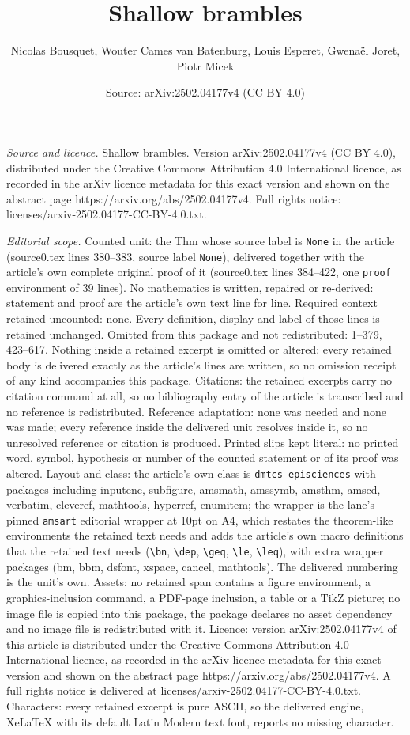 \documentclass[10pt,a4paper]{amsart}
\title[Shallow brambles]{Shallow brambles}
\author{Nicolas Bousquet, Wouter Cames van Batenburg, Louis Esperet, Gwena\"el Joret, Piotr Micek}
\date{Source: arXiv:2502.04177v4 (CC BY 4.0)}
\begin{document}
\maketitle

\noindent\emph{Source and licence.} Shallow brambles. Version arXiv:2502.04177v4 (CC BY 4.0), distributed under the Creative Commons Attribution 4.0 International licence, as recorded in the arXiv licence metadata for this exact version and shown on the abstract page https://arxiv.org/abs/2502.04177v4. Full rights notice: licenses/arxiv-2502.04177-CC-BY-4.0.txt.\par\smallskip

\noindent\textit{Editorial scope.} Counted unit: the Thm whose source label is \texttt{None} in the article (source0.tex lines 380--383, source label \texttt{None}), delivered together with the article's own complete original proof of it (source0.tex lines 384--422, one \texttt{proof} environment of 39 lines). No mathematics is written, repaired or re-derived: statement and proof are the article's own text line for line. Required context retained uncounted: none. Every definition, display and label of those lines is retained unchanged. Omitted from this package and not redistributed: 1--379, 423--617. Nothing inside a retained excerpt is omitted or altered: every retained body is delivered exactly as the article's lines are written, so no omission receipt of any kind accompanies this package. Citations: the retained excerpts carry no citation command at all, so no bibliography entry of the article is transcribed and no reference is redistributed. Reference adaptation: none was needed and none was made; every reference inside the delivered unit resolves inside it, so no unresolved reference or citation is produced. Printed slips kept literal: no printed word, symbol, hypothesis or number of the counted statement or of its proof was altered. Layout and class: the article's own class is \texttt{dmtcs-episciences} with packages including inputenc, subfigure, amsmath, amssymb, amsthm, amscd, verbatim, cleveref, mathtools, hyperref, enumitem; the wrapper is the lane's pinned \texttt{amsart} editorial wrapper at 10pt on A4, which restates the theorem-like environments the retained text needs and adds the article's own macro definitions that the retained text needs (\texttt{\textbackslash bn}, \texttt{\textbackslash dep}, \texttt{\textbackslash geq}, \texttt{\textbackslash le}, \texttt{\textbackslash leq}), with extra wrapper packages (bm, bbm, dsfont, xspace, cancel, mathtools). The delivered numbering is the unit's own. Assets: no retained span contains a figure environment, a graphics-inclusion command, a PDF-page inclusion, a table or a TikZ picture; no image file is copied into this package, the package declares no asset dependency and no image file is redistributed with it. Licence: version arXiv:2502.04177v4 of this article is distributed under the Creative Commons Attribution 4.0 International licence, as recorded in the arXiv licence metadata for this exact version and shown on the abstract page https://arxiv.org/abs/2502.04177v4. A full rights notice is delivered at licenses/arxiv-2502.04177-CC-BY-4.0.txt. Characters: every retained excerpt is pure ASCII, so the delivered engine, XeLaTeX with its default Latin Modern text font, reports no missing character.
\end{document}
